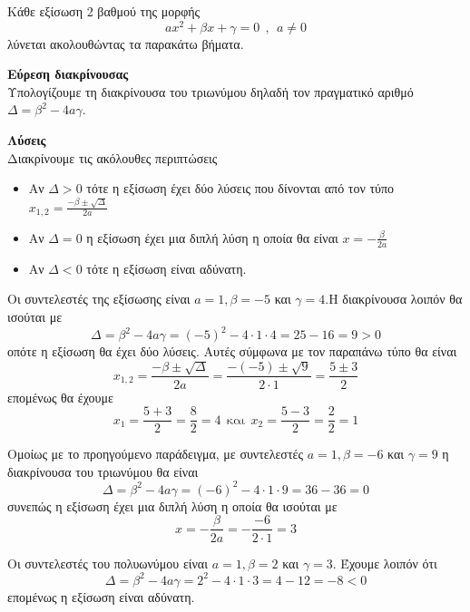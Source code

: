 \begin{Methodos}{9cm}
Κάθε εξίσωση 2 βαθμού της μορφής 
\[ ax^2+\beta x+\gamma=0\ \ ,\ \ a\neq 0 \]
λύνεται ακολουθώντας τα παρακάτω βήματα.
\begin{bhma}
\item\textbf{Εύρεση διακρίνουσας}\\
Υπολογίζουμε τη διακρίνουσα του τριωνύμου δηλαδή τον πραγματικό αριθμό $ \varDelta=\beta^2-4a\gamma $.
\item\textbf{Λύσεις}\\
Διακρίνουμε τις ακόλουθες περιπτώσεις
\begin{itemize}
\item Αν $ \varDelta>0 $ τότε η εξίσωση έχει δύο λύσεις που δίνονται από τον τύπο $ x_{1,2}=\frac{-\beta\pm\sqrt{\varDelta}}{2a} $
\item Αν $ \varDelta=0 $ η εξίσωση έχει μια διπλή λύση η οποία θα είναι
$ x=-\frac{\beta}{2a} $
\item Αν $ \varDelta<0 $ τότε η εξίσωση είναι αδύνατη.
\end{itemize}
\end{bhma}
\end{Methodos}
\lysh
\begin{alist}
\item Οι συντελεστές της εξίσωσης είναι $ a=1,\beta=-5 $ και $ \gamma=4 $.Η διακρίνουσα λοιπόν θα ισούται με
\[ \varDelta=\beta^2-4a\gamma=(-5)^2-4\cdot 1\cdot 4=25-16=9>0 \]
οπότε η εξίσωση θα έχει δύο λύσεις. Αυτές σύμφωνα με τον παραπάνω τύπο θα είναι
\[ x_{1,2}=\frac{-\beta\pm\sqrt{\varDelta}}{2a}=\frac{-(-5)\pm\sqrt{9}}{2\cdot 1}=\frac{5\pm 3}{2} \]
επομένως θα έχουμε
\[ x_1=\frac{5+3}{2}=\frac{8}{2}=4\ \ \textrm{και}\ \ x_2=\frac{5-3}{2}=\frac{2}{2}=1 \]
\item Ομοίως με το προηγούμενο παράδειγμα, με συντελεστές $ a=1,\beta=-6 $ και $ \gamma=9 $ η διακρίνουσα του τριωνύμου θα είναι
\[ \varDelta=\beta^2-4a\gamma=(-6)^2-4\cdot1\cdot9=36-36=0 \]
συνεπώς η εξίσωση έχει μια διπλή λύση η οποία θα ισούται με \[ x=-\frac{\beta}{2a}=-\frac{-6}{2\cdot 1}=3 \]
\item Οι συντελεστές του πολυωνύμου είναι $ a=1,\beta=2 $ και $ \gamma=3 $. Έχουμε λοιπόν ότι
\[ \varDelta=\beta^2-4a\gamma=2^2-4\cdot1\cdot3=4-12=-8<0 \] επομένως η εξίσωση είναι αδύνατη.
\end{alist}
